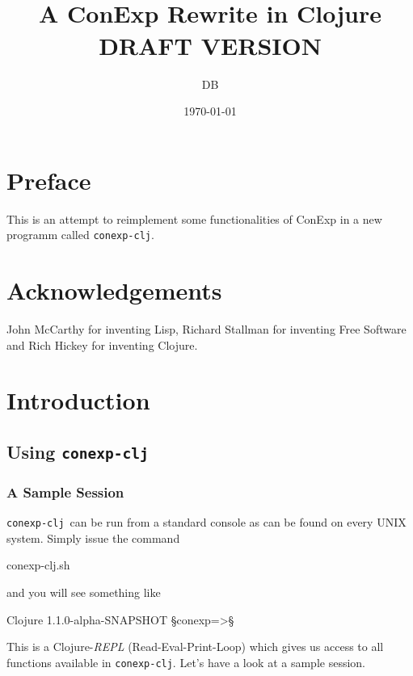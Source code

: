 \documentclass{scrbook}
\title{\conexpclj\\A ConExp Rewrite in Clojure\\[2cm]DRAFT VERSION}
\author{DB}
\date{\today}
\newcommand{\conexpclj}{\texttt{conexp-clj}}
\newcommand{\p}{\color{lightblue}}
\theoremstyle{plain}
\theoremstyle{plain}
\theoremstyle{plain}
\theoremstyle{nonumberplain}
\begin{document}
\maketitle


\chapter*{Preface}

This is an attempt to reimplement some functionalities of ConExp in a
new programm called \conexpclj.


\chapter*{Acknowledgements}

John McCarthy for inventing Lisp, Richard Stallman for inventing Free
Software and Rich Hickey for inventing Clojure.


\tableofcontents


\chapter{Introduction}

\section{Using \conexpclj}

\subsection{A Sample Session}

\conexpclj\ can be run from a standard console as can be found on every UNIX system. Simply issue
the command
\begin{conexp}
  conexp-clj.sh
\end{conexp}
and you will see something like
\begin{conexp}
  Clojure 1.1.0-alpha-SNAPSHOT
  §\p conexp=>§
\end{conexp}
This is a Clojure-\emph{REPL} (Read-Eval-Print-Loop) which gives us access to all functions
available in \conexpclj. Let's have a look at a sample session.
\end{document}
